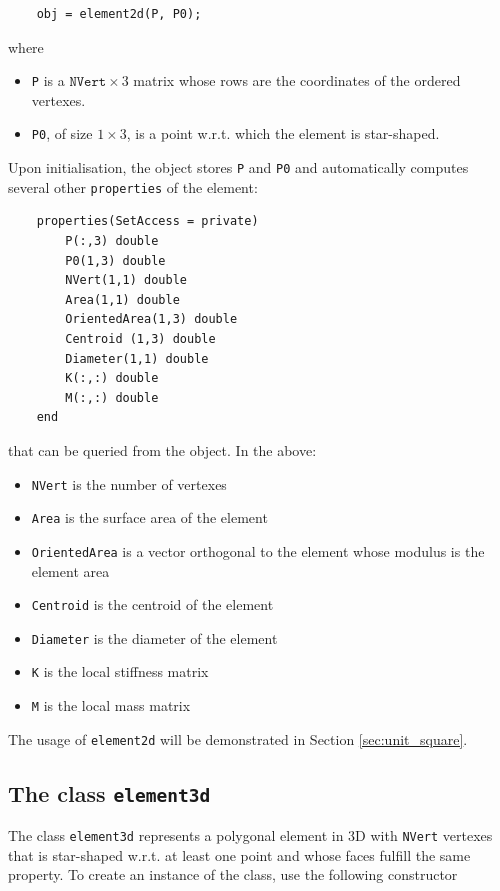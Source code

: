 \documentclass[a4paper]{article}
\begin{document}
\begin{lstlisting}
	obj = element2d(P, P0);
\end{lstlisting}
%
where
\begin{itemize}
\item \texttt{P} is a $\texttt{NVert} \times 3$ matrix whose rows are the coordinates of the ordered vertexes. 
\item \texttt{P0}, of size $1\times 3$, is a point w.r.t. which the element is star-shaped.
\end{itemize}

\noindent
Upon initialisation, the object stores \texttt{P} and \texttt{P0} and automatically computes several other \texttt{properties} of the element:

\begin{lstlisting}
	properties(SetAccess = private)
		P(:,3) double
		P0(1,3) double 
		NVert(1,1) double
		Area(1,1) double 
		OrientedArea(1,3) double
		Centroid (1,3) double
		Diameter(1,1) double
		K(:,:) double
		M(:,:) double
	end
\end{lstlisting}

\noindent
that can be queried from the object. In the above:
\begin{itemize}
\item \texttt{NVert} is the number of vertexes
\item \texttt{Area} is the surface area of the element
\item \texttt{OrientedArea} is a vector orthogonal to the element whose modulus is the element area
\item \texttt{Centroid} is the centroid of the element
\item \texttt{Diameter} is the diameter of the element
\item \texttt{K} is the local stiffness matrix
\item \texttt{M} is the local mass matrix
\end{itemize}

\noindent
The usage of \texttt{element2d} will be demonstrated in Section \ref{sec:unit_square}.

\subsection{The class \texttt{element3d}}
The class \texttt{element3d} represents a polygonal element in 3D with \texttt{NVert} vertexes that is star-shaped w.r.t. at least one point and whose faces fulfill the same property.  To create an instance of the class, use the following constructor
\end{document}
